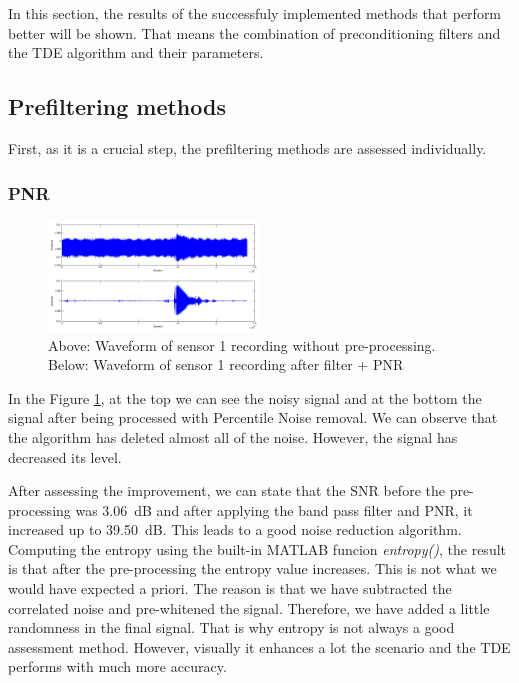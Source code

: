 In this section, the results of the successfuly implemented methods that perform better will be shown. That means the combination of preconditioning filters and the TDE algorithm and their parameters.

\subsection{Prefiltering methods}
First, as it is a crucial step, the prefiltering methods are assessed individually.

\subsubsection{PNR}

  \begin{figure}[htb]
	  \begin{center}
		  \includegraphics[width=0.5\textwidth]{figures/1PNR_waveform.png}
	  \end{center}
	  \caption{Above: Waveform of sensor 1 recording without pre-processing. Below: Waveform of sensor 1 recording after filter + PNR}
	  \label{fig:result_PNR_waveform}
  \end{figure}

  In the Figure \ref{fig:result_PNR_waveform}, at the top we can see the noisy signal and at the bottom the signal after being processed with Percentile Noise removal. We can observe that the algorithm has deleted almost all of the noise. However, the signal has decreased its level.

  After assessing the improvement, we can state that the SNR before the pre-processing was \SI{3.06}{\dB} and after applying the band pass filter and PNR, it increased up to \SI{39.50}{\dB}. This leads to a good noise reduction algorithm. Computing the entropy using the built-in MATLAB funcion \emph{entropy()}, the result is that after the pre-processing the entropy value increases. This is not what we would have expected a priori. The reason is that we have subtracted the correlated noise and pre-whitened the signal. Therefore, we have added a little randomness in the final signal. That is why entropy is not always a good assessment method. However, visually it enhances a lot the scenario and the TDE performs with much more accuracy.
  

